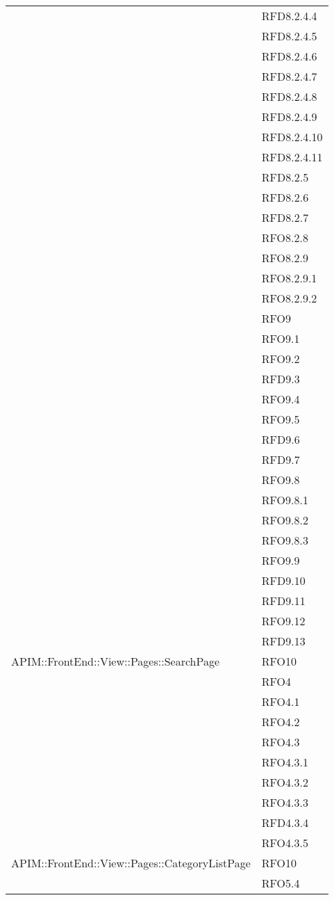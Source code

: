 \begin{longtable}{ p{12cm} | p{3cm} }
			&RFD8.2.4.4\\
			&RFD8.2.4.5\\
			&RFD8.2.4.6\\
			&RFD8.2.4.7\\
			&RFD8.2.4.8\\
			&RFD8.2.4.9\\
			&RFD8.2.4.10\\
			&RFD8.2.4.11\\
			&RFD8.2.5\\
			&RFD8.2.6\\
			&RFD8.2.7\\
			&RFO8.2.8\\
			&RFO8.2.9\\
			&RFO8.2.9.1\\
			&RFO8.2.9.2\\
			&RFO9\\
			&RFO9.1\\
			&RFO9.2\\
			&RFD9.3\\
			&RFO9.4\\
			&RFO9.5\\
			&RFD9.6\\
			&RFD9.7\\
			&RFO9.8\\
			&RFO9.8.1\\
			&RFO9.8.2\\
			&RFO9.8.3\\
			&RFO9.9\\
			&RFD9.10\\
			&RFD9.11\\
			&RFO9.12\\
			&RFD9.13\\
			\hline
		    APIM::FrontEnd::View::Pages::SearchPage& RFO10 \\
		    &RFO4\\
		    &RFO4.1\\
		    &RFO4.2\\
		    &RFO4.3\\
		    &RFO4.3.1\\
		    &RFO4.3.2\\
		    &RFO4.3.3\\
		    &RFD4.3.4\\
		    &RFO4.3.5\\
		    \hline
		    APIM::FrontEnd::View::Pages::CategoryListPage& RFO10 \\
		    &RFO5.4\\
		    

\end{longtable}
